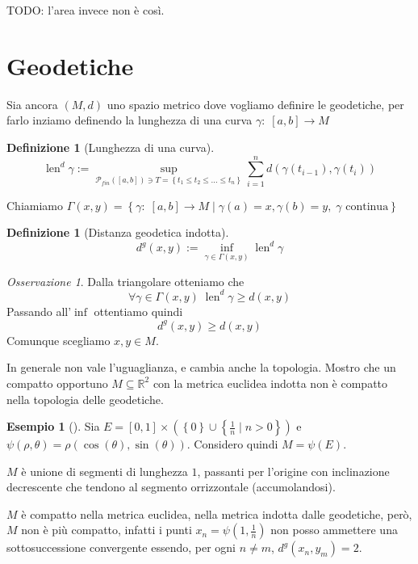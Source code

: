 \documentclass[a4paper,10pt]{article}
\newcounter{counter1}
\theoremstyle{plain}
\theoremstyle{definition}
\newtheorem{mydef}[counter1]{Definizione}
\newtheorem{myes}[counter1]{Esempio}
\theoremstyle{remark}
\newtheorem{myoss}[counter1]{Osservazione}
\newcommand{\set}[1]{\left\{#1\right\}}
\newcommand{\pa}[1]{\left(#1\right)}
\newcommand{\bra}[1]{\left[#1\right]}
\DeclareMathOperator{\len}{len}
\begin{document}
TODO: l'area invece non è così.

\section{Geodetiche}

Sia ancora $(M,d)$ uno spazio metrico dove vogliamo definire le
geodetiche, per farlo inziamo definendo la lunghezza di una curva
$\gamma :\; \bra{a,b} \to M$
\begin{mydef}[Lunghezza di una curva]
  \[ \len^d \gamma := \sup _{\mathcal{P}_{fin}(\bra{a,b}) \ni T =
    \set{t_1 \le t_2 \le ... \le t_n}} \sum_{i=1}^n d\pa{
    \gamma\pa{t_{i-1}}, \gamma\pa{t_i}} \]
\end{mydef}

Chiamiamo $\Gamma (x,y) = \set{\gamma:\; \bra{a,b} \to M \mid
  \gamma(a) = x, \gamma(b) = y,\; \gamma \text{ continua}}$

\begin{mydef}[Distanza geodetica indotta]
  \[ d^g (x,y) := \inf _{\gamma \in \Gamma(x,y)} \len^d \gamma \]
\end{mydef}

\begin{myoss}
  Dalla triangolare otteniamo che 
  \[ \forall \gamma \in \Gamma(x,y) \; \len^d \gamma \ge d(x,y) \]
  Passando all'$\inf$ ottentiamo quindi
  \[ d^g(x,y) \ge d(x,y) \]
  Comunque scegliamo $x,y \in M$.
\end{myoss}

In generale non vale l'uguaglianza, e cambia anche la
topologia. Mostro che un compatto opportuno $M \subseteq \mathbb{R}^2$
con la metrica euclidea indotta non è compatto nella topologia delle
geodetiche.

\begin{myes}[{\cite[Esempio 2.1]{DuciMennucci2007}}]
  Sia $E = \bra{0,1} \times \pa{ \set{0} \cup \set{ \frac{1}{n} \mid n
      > 0} }$ e $\psi(\rho,\theta) = \rho
  \pa{\cos(\theta),\sin(\theta)}$. Considero quindi $M = \psi(E)$.

  $M$ è unione di segmenti di lunghezza $1$, passanti per l'origine
  con inclinazione decrescente che tendono al segmento orrizzontale
  (accumolandosi). %

  $M$ è compatto nella metrica euclidea, nella metrica indotta dalle
  geodetiche, però, $M$ non è più compatto, infatti i punti $x_n =
  \psi(1,\frac{1}{n})$ non posso ammettere una sottosuccessione
  convergente essendo, per ogni $n\neq m$, $d^g(x_n,y_m) = 2$.
\end{myes}
\end{document}
